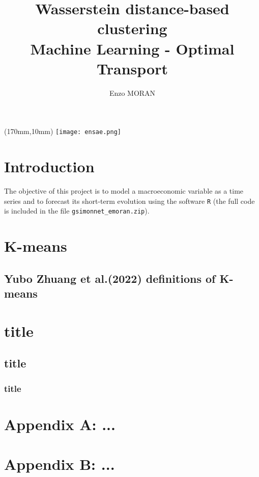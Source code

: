 \documentclass[12pt]{article}
\title{Wasserstein distance-based clustering \\ \large Machine Learning - Optimal Transport}
\author{Enzo MORAN}
\date{}
\begin{document}
\begin{textblock*}{30mm}(170mm,10mm) %
    \texttt{[image: ensae.png]}
\end{textblock*}

\maketitle

\tableofcontents

\newpage

\section*{Introduction}

The objective of this project is to model a macroeconomic variable as a time series and to forecast its short-term evolution using the software \texttt{R} (the full code is included in the file \texttt{gsimonnet\_emoran.zip}).

\section{K-means}

\subsection{Yubo Zhuang et al.(2022) definitions of K-means}




\section{title}

\subsection{title}

\subsubsection{title}




\appendix

\section{Appendix A: ...}
\label{appendix:label}


\section{Appendix B: ...}
\label{appendix:label}
\end{document}

